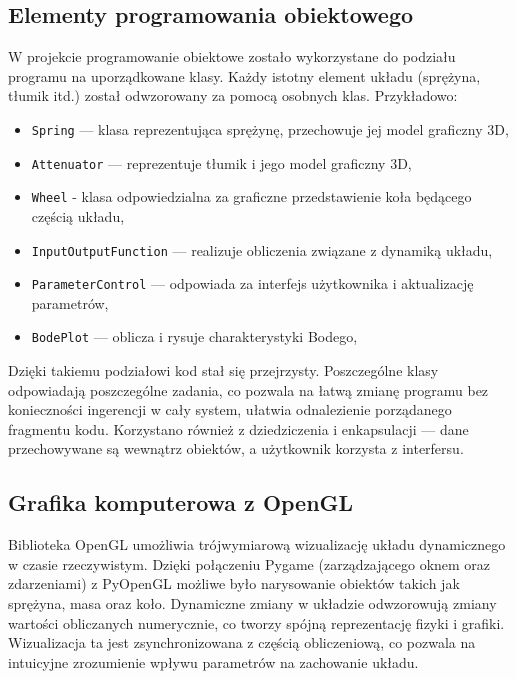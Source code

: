 \documentclass[10pt, a4paper]{article}
\begin{document}
\vspace{0.5cm}

\subsection*{Elementy programowania obiektowego}

W projekcie programowanie obiektowe zostało wykorzystane do podziału programu na uporządkowane klasy. Każdy istotny element układu (sprężyna, tłumik itd.) został odwzorowany za pomocą osobnych klas. Przykładowo:

\begin{itemize}
  \item \texttt{Spring} — klasa reprezentująca sprężynę, przechowuje jej model graficzny 3D,
  \item \texttt{Attenuator} — reprezentuje tłumik i jego model graficzny 3D,
  \item \texttt{Wheel} - klasa odpowiedzialna za graficzne przedstawienie koła będącego częścią układu,
  \item \texttt{InputOutputFunction} — realizuje obliczenia związane z dynamiką układu,
  \item \texttt{ParameterControl} — odpowiada za interfejs użytkownika i aktualizację parametrów,
  \item \texttt{BodePlot} — oblicza i rysuje charakterystyki Bodego,
\end{itemize}

Dzięki takiemu podziałowi kod stał się przejrzysty. Poszczególne klasy odpowiadają poszczególne zadania, co pozwala na łatwą zmianę programu bez konieczności ingerencji w cały system, ułatwia odnalezienie porządanego fragmentu kodu. Korzystano również z dziedziczenia i enkapsulacji — dane przechowywane są wewnątrz obiektów, a użytkownik korzysta z interfersu.

\vspace{0.5cm}

\subsection*{Grafika komputerowa z OpenGL}

Biblioteka OpenGL umożliwia trójwymiarową wizualizację układu dynamicznego w czasie rzeczywistym. Dzięki połączeniu Pygame (zarządzającego oknem oraz zdarzeniami) z PyOpenGL możliwe było narysowanie obiektów takich jak sprężyna, masa oraz koło. Dynamiczne zmiany w układzie odwzorowują zmiany wartości obliczanych numerycznie, co tworzy spójną reprezentację fizyki i grafiki.
Wizualizacja ta jest zsynchronizowana z częścią obliczeniową, co pozwala na intuicyjne zrozumienie wpływu parametrów na zachowanie układu.
\end{document}
